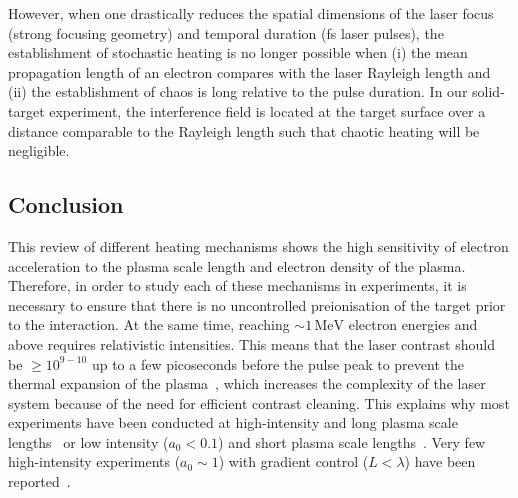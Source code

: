 %
%

However, when one drastically reduces the spatial dimensions of the laser focus (strong focusing geometry) and temporal duration (fs laser pulses), the establishment of stochastic heating is no longer possible when (i) the mean propagation length of an electron compares with the laser Rayleigh length and (ii) the establishment of chaos is long relative to the pulse duration. In our solid-target experiment, the interference field is located at the target surface over a distance comparable to the Rayleigh length such that chaotic heating will be negligible. 

\subsection{Conclusion}

This review of different heating mechanisms shows the high sensitivity of electron acceleration to the plasma scale length and electron density of the plasma. Therefore, in order to study each of these mechanisms in experiments, it is necessary to ensure that there is no uncontrolled preionisation of the target prior to the interaction. At the same time, reaching $\sim 1\,\mathrm{MeV}$ electron energies and above requires relativistic intensities. This means that the laser contrast should be $\ge 10^{9-10}$ up to a few picoseconds before the pulse peak to prevent the thermal expansion of the plasma~\cite{kruer1988physics}, which increases the complexity of the laser system because of the need for efficient contrast cleaning. This explains why most experiments have been conducted at high-intensity and long plasma scale lengths~\cite{kodama2000long,chen2001effects,baton2003evidence,Wang2010,chen2006surface} or low intensity ($a_0 < 0.1$) and short plasma scale lengths~\cite{chen2001hot,li2003spatial}. Very few high-intensity experiments ($a_0\sim1$) with gradient control ($L <\lambda$) have been reported~\cite{mordovanakis2009quasimonoenergetic,thevenet2015}. \\


